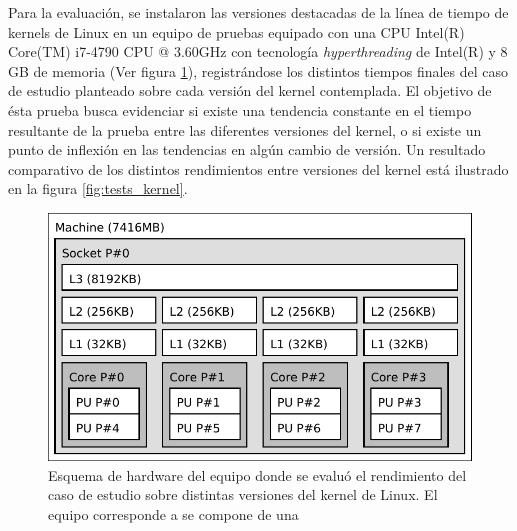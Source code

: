 Para la evaluación, se instalaron las versiones destacadas de la línea de tiempo de kernels de Linux en un equipo de pruebas equipado con una CPU Intel(R) Core(TM) i7-4790 CPU @ 3.60GHz con tecnología \emph{hyperthreading} de Intel(R) y 8 GB de memoria (Ver figura \ref{fig:desktop_kernel_pc}), registrándose los distintos tiempos finales del caso de estudio planteado sobre cada versión del kernel contemplada. El objetivo de ésta prueba busca evidenciar si existe una tendencia constante en el tiempo resultante de la prueba entre las diferentes versiones del kernel, o si existe un punto de inflexión en las tendencias en algún cambio de versión. Un resultado comparativo de los distintos rendimientos entre versiones del kernel está ilustrado en la figura \ref{fig:tests_kernel}.

\begin{figure}[h!]
	\centering
	\includegraphics[scale=0.65]{imagenes/desktopkernelpc.pdf}
	\caption{Esquema de hardware del equipo donde se evaluó el rendimiento del caso de estudio sobre distintas versiones del kernel de Linux. El equipo corresponde a se compone de una }
	\label{fig:desktop_kernel_pc}
\end{figure}


